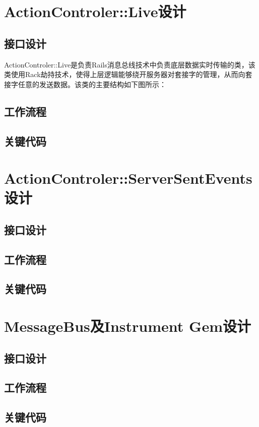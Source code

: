 \section{ActionControler::Live设计}
\subsection{接口设计}
ActionControler::Live是负责Rails消息总线技术中负责底层数据实时传输的类，该类使用Rack劫持技术，使得上层逻辑能够绕开服务器对套接字的管理，从而向套接字任意的发送数据。该类的主要结构如下图所示：
\subsection{工作流程}
\subsection{关键代码}
\section{ActionControler::ServerSentEvents设计}
\subsection{接口设计}
\subsection{工作流程}
\subsection{关键代码}
\section{MessageBus及Instrument Gem设计}
\subsection{接口设计}
\subsection{工作流程}
\subsection{关键代码}










